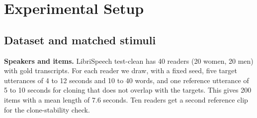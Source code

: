 \begin{table}[t]
\small
\centering
{}
\caption{Closest prior studies. Only this work matches speaker and words, controls for codec artifacts, and measures behaviour and self-report on the same clips.}
\label{tab:delineation}
\end{table}

\section{Experimental Setup}
\label{sec:setup}

\subsection{Dataset and matched stimuli}

\textbf{Speakers and items.} LibriSpeech test-clean \citep{librispeech} has 40 readers (20 women, 20 men) with gold transcripts. For each reader we draw, with a fixed seed, five target utterances of 4 to 12 seconds and 10 to 40 words, and one reference utterance of 5 to 10 seconds for cloning that does not overlap with the targets. This gives 200 items with a mean length of 7.6 seconds. Ten readers get a second reference clip for the clone-stability check.

